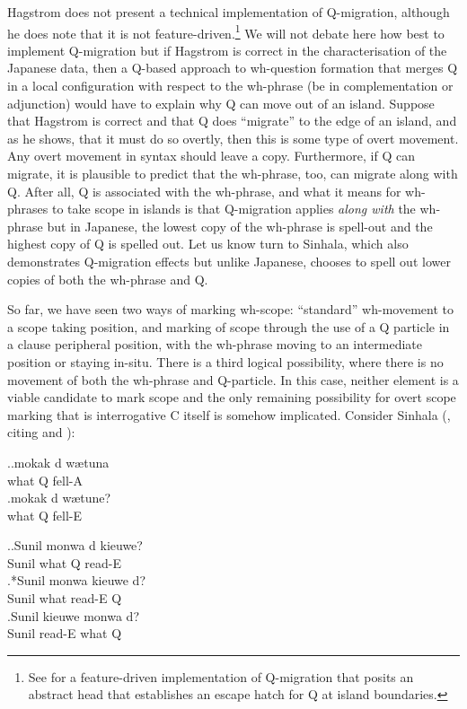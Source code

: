 \documentclass[charis]{glossa}
\begin{document}
Hagstrom does not present a technical implementation of Q-migration, although he does note that it is not feature-driven.\footnote{See \cite{yeo:2010} for a feature-driven implementation of Q-migration that posits an abstract head that establishes an escape hatch for Q at island boundaries.} We will not debate here how best to implement Q-migration but if Hagstrom is correct in the characterisation of the Japanese data, then a Q-based approach to wh-question formation that merges Q in a local configuration with respect to the wh-phrase (be in complementation or adjunction) would have to explain why Q can move out of an island. Suppose that Hagstrom is correct and that Q does ``migrate'' to the edge of an island, and as he shows, that it must do so overtly, then this is some type of overt movement. Any overt movement in syntax should leave a copy. Furthermore, if Q can migrate, it is plausible to predict that the wh-phrase, too, can migrate along with Q. After all, Q is associated with the wh-phrase, and what it means for wh-phrases to take scope in islands is that Q-migration applies \textit{along with} the wh-phrase but in Japanese, the lowest copy of the wh-phrase is spell-out and the highest copy of Q is spelled out. Let us know turn to Sinhala, which also demonstrates Q-migration effects but unlike Japanese, chooses to spell out lower copies of both the wh-phrase and Q.

So far, we have seen two ways of marking wh-scope: ``standard'' wh-movement to a scope taking position, and marking of scope through the use of a Q particle in a clause peripheral position, with the wh-phrase moving to an intermediate position or staying in-situ. There is a third logical possibility, where there is no movement of both the wh-phrase and Q-particle. In this case, neither element is a viable candidate to mark scope and the only remaining possibility for overt scope marking that is interrogative C itself is somehow implicated. Consider Sinhala (\cite{slade:2011}, citing \cite{gair-sumangala:1991} and \cite{hagstrom:1998}):

\ex.\ag.\label{sso.30a}mokak d{\textschwa} w{\ae}tuna\\
   what Q fell-A\\
   \bg.\label{sso.30b}mokak d{\textschwa} w{\ae}tune?\\
   what Q fell-E\\

\ex.\label{sso.31}\ag.\label{sso.31a}Sunil mon{\textschwa}wa d{\textschwa} kieuwe?\\
      Sunil what Q read-E\\
   \bg.*\label{sso.31b}Sunil mon{\textschwa}wa kieuwe d{\textschwa}?\\
      Sunil what read-E Q\\
   \bg.\label{sso.31c}Sunil kieuwe mon{\textschwa}wa d{\textschwa}?\\
      Sunil read-E what Q \\
\end{document}
